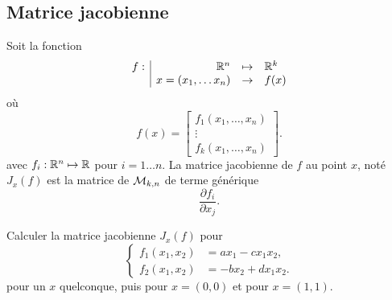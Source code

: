 \subsection{Matrice jacobienne}  \label{sec:MatJacob}

\begin{definition}
  Soit la fonction
  $$
  \begin{array}{r|rcl}
    f : & \mathbb{R}^n & \mapsto & \mathbb{R}^k \\
    & x = (x_1, \dots x_n) & \to & f(x)
  \end{array}
  $$
  où
  $$
  f(x) = \left[\begin{array}{c}
                f_1(x_1, \dots, x_n) \\
                \vdots \\
                f_k(x_1, \dots, x_n) 
               \end{array} \right].
  $$
  avec $f_i: \mathbb{R}^n \mapsto \mathbb{R}$ pour $i = 1 \dots n$.
  La matrice jacobienne de $f$ au point $x$, noté $J_x(f)$ est la matrice de $\mathcal{M}_{k, n}$ de terme générique
  $$
  \frac{\partial f_i}{\partial x_j}.
  $$
\end{definition}

\begin{exercise*}
  Calculer la matrice jacobienne $J_x(f)$ pour
  $$
  \left\{\begin{array}{rl}
          f_1(x_1, x_2) & = a x_1 - c x_1 x_2, \\
          f_2(x_1, x_2) & = -b x_2 + d x_1 x_2.
         \end{array} \right.
  $$
pour un $x$ quelconque, puis pour $x = (0, 0)$ et pour $x=(1, 1)$.
\end{exercise*}

